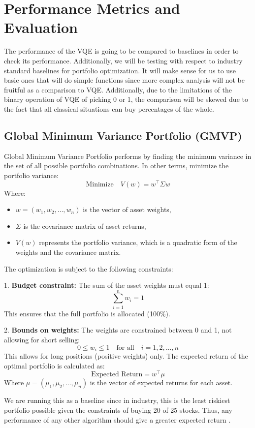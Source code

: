 \documentclass[%
 reprint,
 amsmath,amssymb,
 aps,
]{revtex4-2}
\begin{document}
\section{Performance Metrics and Evaluation}
The performance of the VQE is going to be compared to baselines in order to check its performance. Additionally, we will be testing with respect to industry standard baselines for portfolio optimization. It will make sense for us to use basic ones that will do simple functions since more complex analysis will not be fruitful as a comparison to VQE. Additionally, due to the limitations of the binary operation of VQE of picking 0 or 1, the comparison will be skewed due to the fact that all classical situations can buy percentages of the whole.

\subsection{Global Minimum Variance Portfolio (GMVP)}

Global Minimum Variance Portfolio performs by finding the minimum variance in the set of all possible portfolio combinations. In other terms,
minimize the portfolio variance:
\[
\text{Minimize} \quad V(w) = w^\top \Sigma w
\]
Where:
\begin{itemize}
    \item \( w = (w_1, w_2, \dots, w_n) \) is the vector of asset weights,
    \item \( \Sigma \) is the covariance matrix of asset returns,
    \item \( V(w) \) represents the portfolio variance, which is a quadratic form of the weights and the covariance matrix.
\end{itemize}

The optimization is subject to the following constraints:

1. \textbf{Budget constraint:} The sum of the asset weights must equal 1:
\[
\sum_{i=1}^{n} w_i = 1
\]
This ensures that the full portfolio is allocated (100\%).

2. \textbf{Bounds on weights:} The weights are constrained between 0 and 1, not allowing for short selling:
\[
0 \leq w_i \leq 1 \quad \text{for all} \quad i = 1, 2, \dots, n
\]
This allows for long positions (positive weights) only. The expected return of the optimal portfolio is calculated as:
\[
\text{Expected Return} = w^\top \mu
\]
Where \( \mu = (\mu_1, \mu_2, \dots, \mu_n) \) is the vector of expected returns for each asset.

We are running this as a baseline since in industry, this is the least riskiest portfolio possible given the constraints of buying 20 of 25 stocks. Thus, any performance of any other algorithm should give a greater expected return \cite{Boyd2004}.
\end{document}
